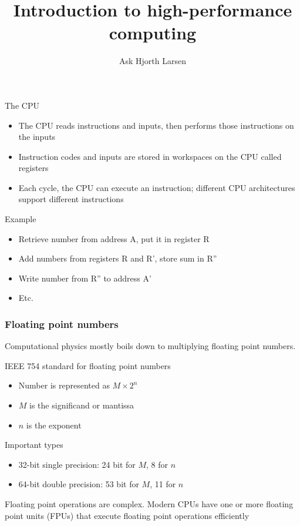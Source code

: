 \documentclass[usenames,dvipsnames,mathserif,compress]{beamer}
\author{Ask Hjorth Larsen}
\begin{document}
\title{Introduction to high-performance computing}

\begin{frame}
  \maketitle
\end{frame}

\begin{frame}
  \begin{block}{The CPU}
    \begin{itemize}
    \item The CPU reads \alert{instructions and inputs}, then performs those instructions on the inputs
    \item Instruction codes and inputs are stored in workspaces
      on the CPU called \alert{registers}
    \item Each cycle, the CPU can execute an instruction; different
      CPU architectures support different instructions
    \end{itemize}
  \end{block}
  \begin{block}{Example}
    \begin{itemize}
    \item Retrieve number from address A, put it in register R
    \item Add numbers from registers R and R', store sum in R''
    \item Write number from R'' to address A'
    \item Etc.
    \end{itemize}
  \end{block}
\end{frame}


\begin{frame}
  \frametitle{Floating point numbers}
  Computational physics mostly boils down to multiplying floating point numbers.
  \begin{block}{IEEE 754 standard for floating point numbers}
    \begin{itemize}
    \item Number is represented as $M \times 2^n$
    \item $M$ is the significand or mantissa
    \item $n$ is the exponent
    \end{itemize}
  \end{block}
  \begin{block}{Important types}
    \begin{itemize}
    \item 32-bit single precision: 24 bit for $M$, 8 for $n$
    \item 64-bit double precision: 53 bit for $M$, 11 for $n$
    \end{itemize}
  \end{block}
  Floating point operations are complex.
  Modern CPUs have one or more \alert{floating point units} (FPUs)
  that execute floating point operations efficiently
\end{frame}
\end{document}
